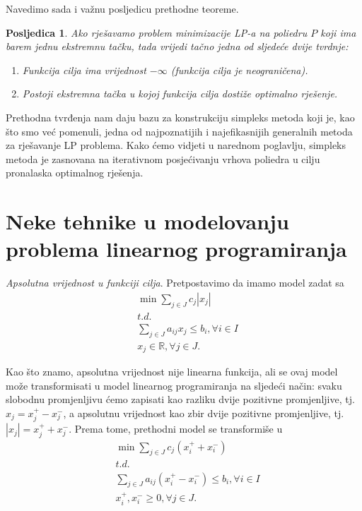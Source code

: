 \documentclass[a4paper, utf8, 11pt, colorlinks]{book}
\newtheorem{poslje}{Posljedica}[chapter]
\theoremstyle{definition}
\begin{document}
 Navedimo sada i važnu posljedicu prethodne teoreme.
 \begin{poslje}
Ako  rješavamo problem minimizacije LP-a na poliedru $P$ koji ima barem jednu ekstremnu tačku, tada vrijedi tačno jedna od sljedeće dvije tvrdnje:
   \begin{enumerate}
       \item Funkcija cilja ima vrijednost $- \infty$ (funkcija cilja je neograničena).
       \item Postoji ekstremna tačka u kojoj funkcija cilja dostiže optimalno rješenje. 
   \end{enumerate}
 \end{poslje}

 Prethodna tvrđenja nam daju bazu za konstrukciju simpleks metoda koji je, kao što smo već pomenuli, jedna od najpoznatijih i najefikasnijih generalnih metoda za rješavanje LP problema.
Kako ćemo vidjeti u narednom poglavlju, simpleks metoda je zasnovana na iterativnom posjećivanju vrhova poliedra  u cilju pronalaska optimalnog rješenja.

\section{Neke tehnike u modelovanju problema linearnog programiranja}

\emph{Apsolutna vrijednost u funkciji cilja}.   Pretpostavimo da imamo model zadat sa 
\begin{align}
	&\min \sum_{j \in J} c_j |x_j| \nonumber \\
	& t.d. \nonumber \\
	& \sum_{j\in J} a_{ij} x_j \leq b_i, \forall i\in I  \nonumber \\
	& x_j \in \mathbb{R}, \forall j \in J. \label{eq:lp_abs}
\end{align} 
 
Kao što znamo, apsolutna vrijednost nije linearna funkcija, ali se ovaj model može transformisati u model linearnog programiranja na sljedeći način: 
svaku slobodnu promjenljivu ćemo zapisati kao razliku dvije pozitivne promjenljive, tj.  $x_j = x_j^+ - x_j^-$, a apsolutnu vrijednost kao zbir dvije pozitivne promjenljive, tj. $|x_j|= x_j^+ + x_j^-$. Prema tome, prethodni model se transformiše  u 
\begin{align}
	&\min \sum_{j \in J} c_j  (x_i^+ + x_i^-) \nonumber \\
	& t.d. \nonumber \\
	&\sum_{j\in J} a_{ij} (  x_i^+ - x_i^- ) \leq b_i, \forall i \in I \nonumber \\
	&  x_i^+, x_i^- \geq 0, \forall j\in J. \label{eq:lp_abs_transformed}
\end{align}
\end{document}
